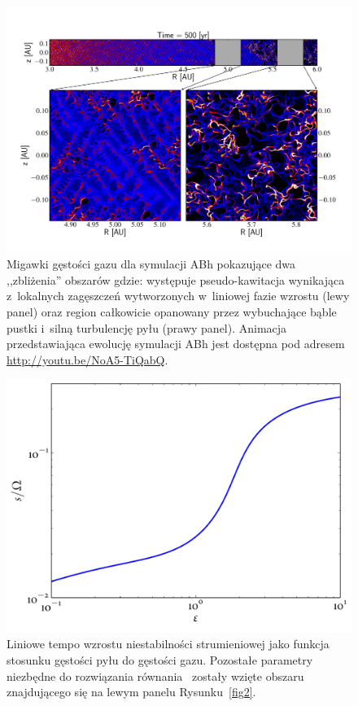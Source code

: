 \begin{figure} 
\centering
\includegraphics[width=0.98\linewidth]{figures/fig3}
\caption{Migawki gęstości gazu dla symulacji ABh pokazujące dwa ,,zbliżenia''
   obszarów gdzie: występuje pseudo-kawitacja wynikająca z~lokalnych zagęszczeń
   wytworzonych w~liniowej fazie wzrostu (lewy panel) oraz region całkowicie
   opanowany przez wybuchające bąble pustki i~silną turbulencję pyłu (prawy
   panel). Animacja przedstawiająca ewolucję symulacji ABh jest dostępna pod
   adresem \href{http://youtu.be/NoA5-TiQabQ}{http://youtu.be/NoA5-TiQabQ}.}
\label{fig3}
\end{figure}

\begin{figure}
   \centering
   \includegraphics[width=0.5\linewidth]{figures/growthAB}
   \caption{Liniowe tempo wzrostu niestabilności strumieniowej jako funkcja
      stosunku gęstości pyłu do gęstości gazu. Pozostałe parametry niezbędne do
      rozwiązania równania~ zostały wzięte obszaru znajdującego
   się na lewym panelu Rysunku~\ref{fig2}.}
   \label{fig2b}
\end{figure}


